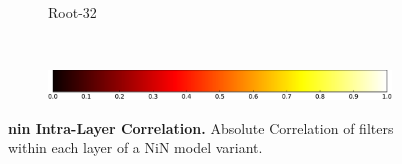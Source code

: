 \documentclass[thesis]{subfiles}
\begin{document}
{\begin{landscape}
\begin{figure}[p]
\begin{subfigure}[c]{0.97\linewidth}
					~
					~
					~
					~
					\caption{Root-32}\label{fig:corrroot32}
					\vspace*{0.6em}
				\end{subfigure}\\
				\begin{subfigure}[c]{0.97\linewidth}
    				\centering
	    			\includegraphics[width=0.4\linewidth]{Figs/PDF/colorbar}
				\end{subfigure}
				\caption[Intra-layer filter correlation]{\textbf{\Gls{nin} Intra-Layer Correlation.} Absolute Correlation of filters within each layer of a NiN model variant.}
				\label{fig:nincorr}
			\end{figure}
		\end{landscape}
		\begin{landscape}
			\begin{figure}[p]
				\begin{subfigure}[c]{0.95\linewidth}
					\centering

\end{subfigure}
\end{figure}
\end{landscape}}
\end{document}
